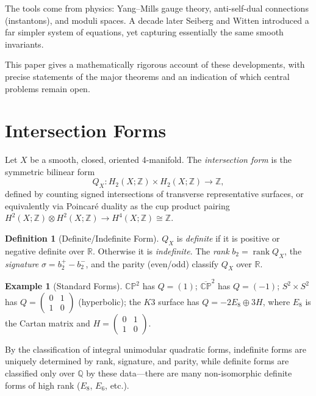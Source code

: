 \documentclass[12pt,a4paper]{amsart}
\theoremstyle{definition}
\newtheorem{definition}[theorem]{Definition}
\newtheorem{example}[theorem]{Example}
\theoremstyle{remark}
\DeclareMathOperator{\rank}{rank}
\newcommand{\CP}{\mathbb{CP}}
\newcommand{\ZZ}{\mathbb{Z}}
\newcommand{\RR}{\mathbb{R}}
\newcommand{\QQ}{\mathbb{Q}}
\begin{document}
The tools come from physics: Yang--Mills gauge theory, anti-self-dual
connections (instantons), and moduli spaces.  A decade later Seiberg and
Witten \cite{SeibergWitten1994} introduced a far simpler system of
equations, yet capturing essentially the same smooth invariants.

This paper gives a mathematically rigorous account of these developments,
with precise statements of the major theorems and an indication of which
central problems remain open.

\section{Intersection Forms}

Let $X$ be a smooth, closed, oriented 4-manifold.  The \emph{intersection
form} is the symmetric bilinear form
\[
  Q_X \colon H_2(X;\ZZ) \times H_2(X;\ZZ) \longrightarrow \ZZ,
\]
defined by counting signed intersections of transverse representative
surfaces, or equivalently via Poincaré duality as the cup product pairing
$H^2(X;\ZZ) \otimes H^2(X;\ZZ) \to H^4(X;\ZZ) \cong \ZZ$.

\begin{definition}[Definite/Indefinite Form]
$Q_X$ is \emph{definite} if it is positive or negative definite over $\RR$.
Otherwise it is \emph{indefinite}.  The \emph{rank} $b_2 = \rank Q_X$,
the \emph{signature} $\sigma = b_2^+ - b_2^-$, and the parity (even/odd)
classify $Q_X$ over $\RR$.
\end{definition}

\begin{example}[Standard Forms]
$\CP^2$ has $Q = (1)$; $\overline{\CP}^2$ has $Q = (-1)$;
$S^2 \times S^2$ has $Q = \begin{pmatrix}0&1\\1&0\end{pmatrix}$ (hyperbolic);
the $K3$ surface has $Q = -2E_8 \oplus 3H$, where $E_8$ is the Cartan matrix
and $H = \begin{pmatrix}0&1\\1&0\end{pmatrix}$.
\end{example}

By the classification of integral unimodular quadratic forms, indefinite
forms are uniquely determined by rank, signature, and parity, while
definite forms are classified only over $\QQ$ by these data---there are
many non-isomorphic definite forms of high rank ($E_8$, $E_6$, etc.).
\end{document}
